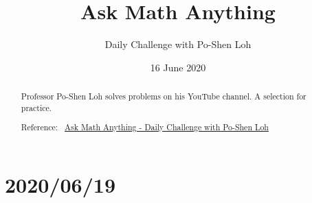 \documentclass[12pt]{article}
\title{Ask Math Anything}
\author{Daily Challenge with Po-Shen Loh}
\date{16 June 2020}
\begin{document}
\begin{minipage}{\textwidth}
\maketitle
\begin{abstract}
Professor Po-Shen Loh solves problems on his YouTube channel. A selection for practice. 

Reference:~ 
\href{https://www.youtube.com/channel/UCf78EJOm4wQ4xXwSS15PuxQ}{Ask Math Anything - Daily Challenge with Po-Shen Loh}
\end{abstract}
\end{minipage}

\section*{2020/06/19}
\end{document}
